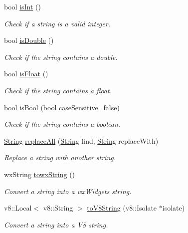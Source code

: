 \begin{DoxyCompactItemize}
bool \mbox{\hyperlink{class_rad_j_a_v_1_1_string_a8f4fec14c1752e3edb811a6e6f9c99ce}{is\+Int}} ()
\begin{DoxyCompactList}\small\item\em Check if a string is a valid integer. \end{DoxyCompactList}\item 
bool \mbox{\hyperlink{class_rad_j_a_v_1_1_string_a51e463c671c993ce10184f68dac050d0}{is\+Double}} ()
\begin{DoxyCompactList}\small\item\em Check if the string contains a double. \end{DoxyCompactList}\item 
bool \mbox{\hyperlink{class_rad_j_a_v_1_1_string_a3fdf5f2aef734fffa2d23964668641be}{is\+Float}} ()
\begin{DoxyCompactList}\small\item\em Check if the string contains a float. \end{DoxyCompactList}\item 
bool \mbox{\hyperlink{class_rad_j_a_v_1_1_string_a07cb003b91b01e8dd78a7b534bdad243}{is\+Bool}} (bool case\+Sensitive=false)
\begin{DoxyCompactList}\small\item\em Check if the string contains a boolean. \end{DoxyCompactList}\item 
\mbox{\hyperlink{class_rad_j_a_v_1_1_string}{String}} \mbox{\hyperlink{class_rad_j_a_v_1_1_string_a8631dd8fc8ed789ab959315f7e73ddb4}{replace\+All}} (\mbox{\hyperlink{class_rad_j_a_v_1_1_string}{String}} find, \mbox{\hyperlink{class_rad_j_a_v_1_1_string}{String}} replace\+With)
\begin{DoxyCompactList}\small\item\em Replace a string with another string. \end{DoxyCompactList}\item 
wx\+String \mbox{\hyperlink{class_rad_j_a_v_1_1_string_a97887990d083861ef56140b7f53dbe7a}{towx\+String}} ()
\begin{DoxyCompactList}\small\item\em Convert a string into a wx\+Widgets string. \end{DoxyCompactList}\item 
v8\+::\+Local$<$ v8\+::\+String $>$ \mbox{\hyperlink{class_rad_j_a_v_1_1_string_a643c90b7e35b74db4fc800c877f1ac60}{to\+V8\+String}} (v8\+::\+Isolate $\ast$isolate)
\begin{DoxyCompactList}\small\item\em Convert a string into a V8 string. \end{DoxyCompactList}\end{DoxyCompactItemize}
